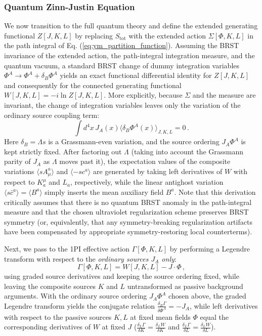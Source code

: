 \subsubsection{Quantum Zinn-Justin Equation}

We now transition to the full quantum theory and define the extended generating functional \(Z[J, K, L]\) by replacing \(S_{\text{tot}}\) with the extended action \(\Sigma[\Phi, K, L]\) in the path integral of Eq. (\ref{eq:ym_partition_function}). Assuming the BRST invariance of the extended action, the path-integral integration measure, and the quantum vacuum, a standard BRST change of dummy integration variables \(\Phi^A \rightarrow \Phi^A + \delta_B \Phi^A\) yields an exact functional differential identity for \(Z[J, K, L]\) and consequently for the connected generating functional \(W[J, K, L] = -i \ln Z[J, K, L]\). More explicitly, because \(\Sigma\) and the measure are invariant, the change of integration variables leaves only the variation of the ordinary source coupling term:
\[
    \int d^4x \, J_A(x) \langle \delta_B \Phi^A(x) \rangle_{J, K, L} = 0 \, .
\]
Here \(\delta_B = \Lambda s\) is a Grassmann-even variation, and the source ordering \(J_A \Phi^A\) is kept strictly fixed. After factoring out \(\Lambda\) (taking into account the Grassmann parity of \(J_A\) as \(\Lambda\) moves past it), the expectation values of the composite variations \(\langle sA_\mu^a \rangle\) and \(\langle -sc^a \rangle\) are generated by taking left derivatives of \(W\) with respect to \(K_a^\mu\) and \(L_a\), respectively, while the linear antighost variation \(\langle s\bar{c}^a \rangle = \langle B^a \rangle\) simply inserts the mean auxiliary field \(B^a\). Note that this derivation critically assumes that there is no quantum BRST anomaly in the path-integral measure and that the chosen ultraviolet regularization scheme preserves BRST symmetry (or, equivalently, that any symmetry-breaking regularization artifacts have been compensated by appropriate symmetry-restoring local counterterms).

Next, we pass to the 1PI effective action \(\Gamma[\Phi, K, L]\) by performing a Legendre transform with respect to the \textit{ordinary sources \(J_A\) only}:
\[
    \Gamma[\Phi, K, L] = W[J, K, L] - J \cdot \Phi \, ,
\]
using graded source derivatives and keeping the source ordering fixed, while leaving the composite sources \(K\) and \(L\) untransformed as passive background arguments. With the ordinary source ordering \(J_A \Phi^A\) chosen above, the graded Legendre transform yields the conjugate relation \(\frac{\delta_R \Gamma}{\delta \Phi^A} = -J_A\), while left derivatives with respect to the passive sources \(K, L\) at fixed mean fields \(\Phi\) equal the corresponding derivatives of \(W\) at fixed \(J\) (\(\frac{\delta_L \Gamma}{\delta K} = \frac{\delta_L W}{\delta K}\) and \(\frac{\delta_L \Gamma}{\delta L} = \frac{\delta_L W}{\delta L}\)).


